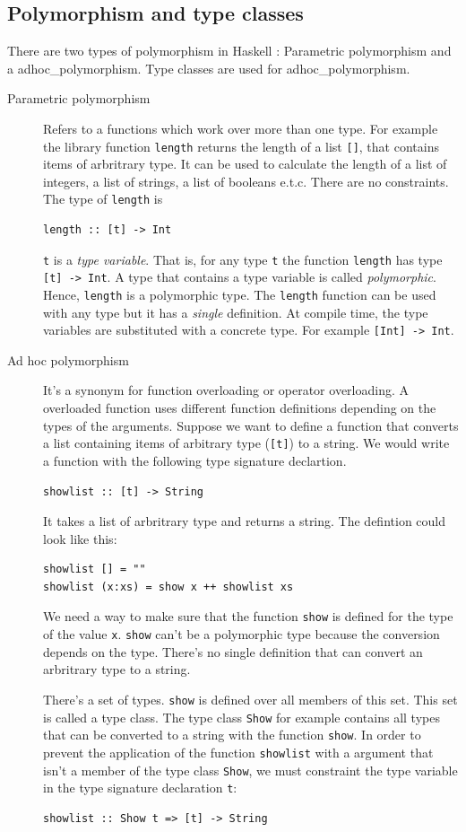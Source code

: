 \subsection{Polymorphism and type classes}
\label{sec:polymorphism}
There are two types of polymorphism in Haskell \cite{Cardelli}: Parametric polymorphism and a \gls{adhoc_polymorphism}. Type classes are used for \gls{adhoc_polymorphism}.
\begin{description}
\item[Parametric polymorphism] Refers to a functions which work over more than one type. For example the library function \verb|length| returns the length of a list \verb|[]|, that contains items of arbritrary type. It can be used to calculate the length of a list of integers, a list of strings, a list of booleans e.t.c. There are no constraints. The type of \verb|length| is
\begin{verbatim}
length :: [t] -> Int
\end{verbatim}
\verb|t| is a \emph{type variable}. That is, for any type \verb|t| the function \verb|length| has type \verb|[t] -> Int|. A type that contains a type variable is called \emph{polymorphic}. Hence, \verb|length| is a polymorphic type.
The \verb|length| function can be used with any type but it has a \emph{single} definition.  At compile time, the type variables are substituted with a concrete type. For example
\verb|[Int] -> Int|. 
\item[Ad hoc polymorphism] It's a synonym for function overloading or operator overloading. A overloaded function uses different function definitions depending on the types of the arguments. Suppose we want to define a function that converts a list containing items of arbitrary type (\verb|[t]|) to a string. We would write a function with the following type signature declartion.
\begin{verbatim}
showlist :: [t] -> String
\end{verbatim}
It takes a list of arbritrary type and returns a string. The defintion could look like this:
\begin{verbatim}
showlist [] = ""
showlist (x:xs) = show x ++ showlist xs
\end{verbatim}
We need a way to make sure that the function \verb|show| is defined for the type of the value \verb|x|. \verb|show| can't be a polymorphic type because the conversion depends on the type. There's no single definition that can convert an arbritrary type to a string. 

There's a set of types. \verb|show| is defined over all members of this set. This set is called a type class. The type class \verb|Show| for example contains all types that can be converted to a string with the function \verb|show|. In order to prevent the application of the function \verb|showlist| with a argument that isn't a member of the type class \verb|Show|, we must constraint the type variable in the type signature declaration \verb|t|:
\begin{verbatim}
showlist :: Show t => [t] -> String
\end{verbatim}
\end{description}

